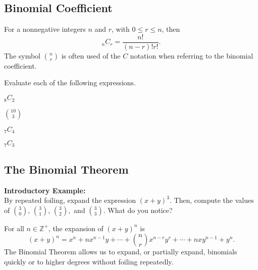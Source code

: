 \documentclass[addpoints]{exam}
\begin{document}
\subsection*{Binomial Coefficient}
\begin{tcolorbox}[title=Definition: \textit{Combinations},title filled,colframe=black,sharpish corners,width=\linewidth]
    For a nonnegative integers $n$ and $r$, with $0\le r\le n$, then \[_nC_r=\frac{n!}{(n-r)!r!}.\] The symbol $\displaystyle\binom{n}{r}$ is often used of the $C$ notation when referring to the binomial coefficient. 
\end{tcolorbox}
\noindent Evaluate each of the following expressions.
\begin{questions}
    \begin{minipage}{.2\linewidth}
        \question $\displaystyle_8C_2$
    \end{minipage}
    \hfill
    \begin{minipage}{.2\linewidth}
        \question $\displaystyle\binom{10}{3}$
    \end{minipage}
    \hfill
    \begin{minipage}{.2\linewidth}
        \question $\displaystyle_7C_4$
    \end{minipage}
    \begin{minipage}{.2\linewidth}
        \question $\displaystyle_7C_3$
    \end{minipage}

\end{questions}

\newpage

\subsection*{The Binomial Theorem}
\noindent\textbf{Introductory Example:}\\ 
By repeated foiling, expand the expression $(x+y)^3$. Then, compute the values of $\displaystyle\binom{3}{0},\,\binom{3}{1},\,\binom{3}{2},$ and $\displaystyle\binom{3}{3}$. What do you notice?


\begin{tcolorbox}[title=Definition: \textit{The Binomial Theorem},title filled,colframe=black,sharpish corners,width=\linewidth]
For all $n\in\mathbb{Z}^+$, the expansion of $(x+y)^n$ is \[(x+y)^n=x^n+nx^{n-1}y+\cdots+\binom{n}{r}x^{n-r}y^r+\cdots+nxy^{n-1}+y^n.\] The Binomial Theorem allows us to expand, or partially expand, binomials quickly or to higher degrees without foiling repeatedly.
\end{tcolorbox}
\end{document}
